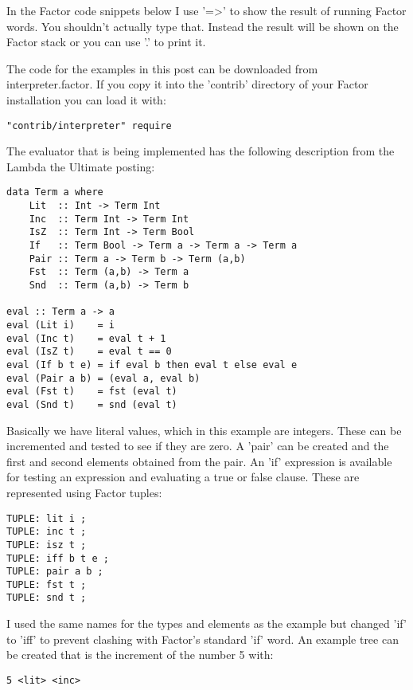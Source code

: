 In the Factor code snippets below I use '=>' to show the result of
running Factor words. You shouldn't actually type that. Instead the
result will be shown on the Factor stack or you can use '.' to print
it.

The code for the examples in this post can be downloaded from
interpreter.factor. If you copy it into the 'contrib' directory of
your Factor installation you can load it with:


\begin{verbatim}
"contrib/interpreter" require
\end{verbatim}

The evaluator that is being implemented has the following description
 from the Lambda the Ultimate posting:

\begin{verbatim}
data Term a where
    Lit  :: Int -> Term Int
    Inc  :: Term Int -> Term Int
    IsZ  :: Term Int -> Term Bool
    If   :: Term Bool -> Term a -> Term a -> Term a
    Pair :: Term a -> Term b -> Term (a,b)
    Fst  :: Term (a,b) -> Term a
    Snd  :: Term (a,b) -> Term b 
  
eval :: Term a -> a
eval (Lit i)    = i
eval (Inc t)    = eval t + 1
eval (IsZ t)    = eval t == 0
eval (If b t e) = if eval b then eval t else eval e
eval (Pair a b) = (eval a, eval b)
eval (Fst t)    = fst (eval t)
eval (Snd t)    = snd (eval t)
\end{verbatim}

Basically we have literal values, which in this example are
 integers. These can be incremented and tested to see if they are
 zero. A 'pair' can be created and the first and second elements
 obtained from the pair. An 'if' expression is available for testing
 an expression and evaluating a true or false clause. These are
 represented using Factor tuples:

\begin{verbatim}
TUPLE: lit i ;
TUPLE: inc t ;
TUPLE: isz t ;
TUPLE: iff b t e ;
TUPLE: pair a b ;
TUPLE: fst t ;
TUPLE: snd t ;
\end{verbatim}

I used the same names for the types and elements as the example but
changed 'if' to 'iff' to prevent clashing with Factor's standard 'if'
word. An example tree can be created that is the increment of the
number 5 with:

\begin{verbatim}
5 <lit> <inc>
\end{verbatim}

